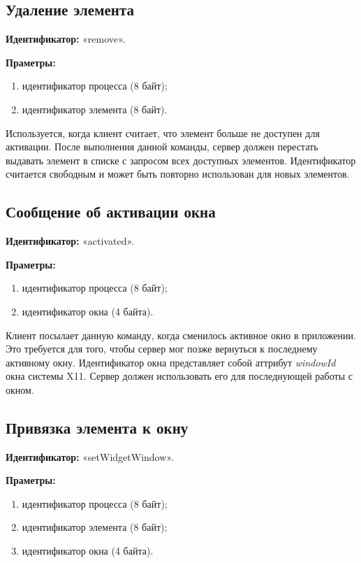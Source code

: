 \subsection{Удаление элемента}

\textbf{Идентификатор:} «remove».

\textbf{Праметры:}
\begin{enumerate}
\item идентификатор процесса (8 байт);
\item идентификатор элемента (8 байт).
\end{enumerate}

Используется, когда клиент считает, что элемент больше не доступен для
активации. После выполнения данной команды, сервер должен перестать выдавать
элемент в списке с запросом всех доступных элементов. Идентификатор считается
свободным и может быть повторно использован для новых элементов.

\subsection{Сообщение об активации окна}

\textbf{Идентификатор:} «activated».

\textbf{Праметры:}
\begin{enumerate}
\item идентификатор процесса (8 байт);
\item идентификатор окна (4 байта).
\end{enumerate}

Клиент посылает данную команду, когда сменилось активное окно в приложении. Это
требуется для того, чтобы сервер мог позже вернуться к последнему активному
окну. Идентификатор окна представляет собой аттрибут \textit{windowId} окна
системы X11. Сервер должен использовать его для последнующей работы с окном.

\subsection{Привязка элемента к окну}

\textbf{Идентификатор:} «setWidgetWindow».

\textbf{Праметры:}
\begin{enumerate}
\item идентификатор процесса (8 байт);
\item идентификатор элемента (8 байт);
\item идентификатор окна (4 байта).
\end{enumerate}

